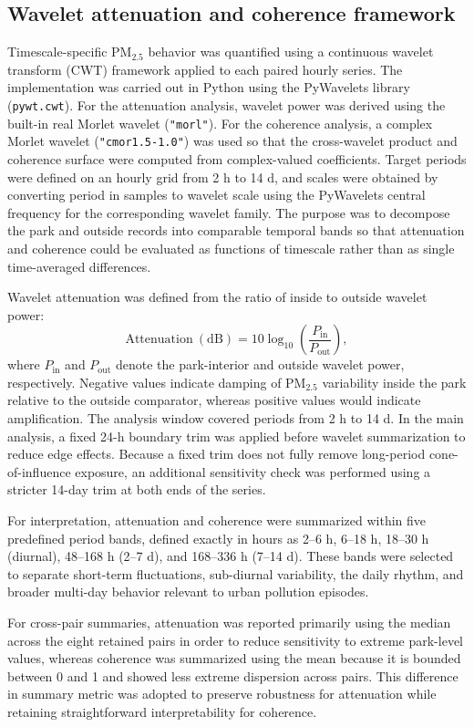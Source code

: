 \subsection{Wavelet attenuation and coherence framework}

Timescale-specific PM$_{2.5}$ behavior was quantified using a continuous wavelet transform (CWT) framework applied to each paired hourly series. The implementation was carried out in Python using the PyWavelets library (\texttt{pywt.cwt}). For the attenuation analysis, wavelet power was derived using the built-in real Morlet wavelet (\texttt{"morl"}). For the coherence analysis, a complex Morlet wavelet (\texttt{"cmor1.5-1.0"}) was used so that the cross-wavelet product and coherence surface were computed from complex-valued coefficients. Target periods were defined on an hourly grid from 2 h to 14 d, and scales were obtained by converting period in samples to wavelet scale using the PyWavelets central frequency for the corresponding wavelet family. The purpose was to decompose the park and outside records into comparable temporal bands so that attenuation and coherence could be evaluated as functions of timescale rather than as single time-averaged differences.

Wavelet attenuation was defined from the ratio of inside to outside wavelet power:
\[
\mathrm{Attenuation\ (dB)} = 10 \log_{10}\left(\frac{P_{\mathrm{in}}}{P_{\mathrm{out}}}\right),
\]
where $P_{\mathrm{in}}$ and $P_{\mathrm{out}}$ denote the park-interior and outside wavelet power, respectively. Negative values indicate damping of PM$_{2.5}$ variability inside the park relative to the outside comparator, whereas positive values would indicate amplification. The analysis window covered periods from 2 h to 14 d. In the main analysis, a fixed 24-h boundary trim was applied before wavelet summarization to reduce edge effects. Because a fixed trim does not fully remove long-period cone-of-influence exposure, an additional sensitivity check was performed using a stricter 14-day trim at both ends of the series.

For interpretation, attenuation and coherence were summarized within five predefined period bands, defined exactly in hours as 2--6 h, 6--18 h, 18--30 h (diurnal), 48--168 h (2--7 d), and 168--336 h (7--14 d). These bands were selected to separate short-term fluctuations, sub-diurnal variability, the daily rhythm, and broader multi-day behavior relevant to urban pollution episodes.

For cross-pair summaries, attenuation was reported primarily using the median across the eight retained pairs in order to reduce sensitivity to extreme park-level values, whereas coherence was summarized using the mean because it is bounded between 0 and 1 and showed less extreme dispersion across pairs. This difference in summary metric was adopted to preserve robustness for attenuation while retaining straightforward interpretability for coherence.

